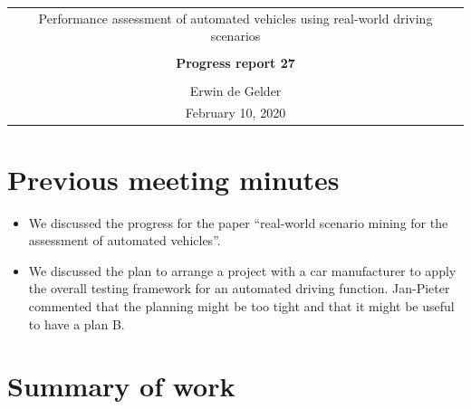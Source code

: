 \documentclass[10pt,final,a4paper,oneside,onecolumn]{article}
\newcommand{\progressreportnumber}{27}
\renewcommand{\author}{Erwin de Gelder}
\renewcommand{\date}{February 10, 2020}
\renewcommand{\title}{Performance assessment of automated vehicles using real-world driving scenarios}
\begin{document}
	
\begin{center}
	\begin{tabular}{c}
		\title \\ \\
		\textbf{\huge Progress report \progressreportnumber} \\ \\
		\author \\ 
		\date
	\end{tabular}
\end{center}

\section{Previous meeting minutes}

\begin{itemize}
	\item We discussed the progress for the paper ``real-world scenario mining for the assessment of automated vehicles''.
	\item We discussed the plan to arrange a project with a car manufacturer to apply the overall testing framework for an automated driving function. Jan-Pieter commented that the planning might be too tight and that it might be useful to have a plan B.
\end{itemize}

\section{Summary of work}
\end{document}
